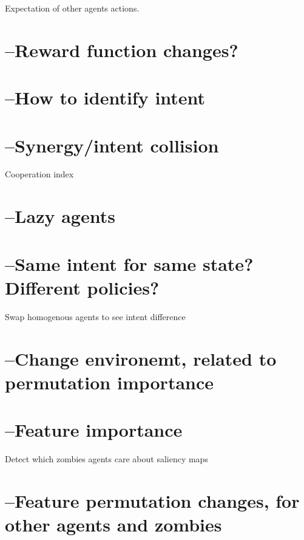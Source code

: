 \documentclass[UKenglish]{uiomasterthesis}
\begin{document}
Expectation of other agents actions.


\section{--Reward function changes?}

\section{--How to identify intent}

\section{--Synergy/intent collision}
Cooperation index

\section{--Lazy agents}

\section{--Same intent for same state? Different policies?}
Swap homogenous agents to see intent difference

\section{--Change environemt, related to permutation importance}

\section{--Feature importance}
Detect which zombies agents care about
saliency maps

\section{--Feature permutation changes, for other agents and zombies}

{}

\end{document}
